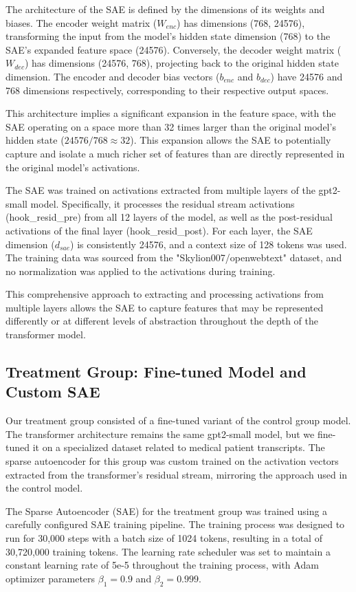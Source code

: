 The architecture of the SAE is defined by the dimensions of its weights and biases. The encoder weight matrix ($W_{enc}$) has dimensions (768, 24576), transforming the input from the model's hidden state dimension (768) to the SAE's expanded feature space (24576). Conversely, the decoder weight matrix ($W_{dec}$) has dimensions (24576, 768), projecting back to the original hidden state dimension. The encoder and decoder bias vectors ($b_{enc}$ and $b_{dec}$) have 24576 and 768 dimensions respectively, corresponding to their respective output spaces.

This architecture implies a significant expansion in the feature space, with the SAE operating on a space more than 32 times larger than the original model's hidden state ($24576 / 768 \approx 32$). This expansion allows the SAE to potentially capture and isolate a much richer set of features than are directly represented in the original model's activations.

The SAE was trained on activations extracted from multiple layers of the gpt2-small model. Specifically, it processes the residual stream activations (hook\_resid\_pre) from all 12 layers of the model, as well as the post-residual activations of the final layer (hook\_resid\_post). For each layer, the SAE dimension ($d_{sae}$) is consistently 24576, and a context size of 128 tokens was used. The training data was sourced from the "Skylion007/openwebtext" dataset, and no normalization was applied to the activations during training.

This comprehensive approach to extracting and processing activations from multiple layers allows the SAE to capture features that may be represented differently or at different levels of abstraction throughout the depth of the transformer model.

\subsection{Treatment Group: Fine-tuned Model and Custom SAE}

Our treatment group consisted of a fine-tuned variant of the control group model. The transformer architecture remains the same gpt2-small model, but we fine-tuned it on a specialized dataset related to medical patient transcripts. The sparse autoencoder for this group was custom trained on the activation vectors extracted from the transformer's residual stream, mirroring the approach used in the control model.

The Sparse Autoencoder (SAE) for the treatment group was trained using a carefully configured SAE training pipeline. The training process was designed to run for 30,000 steps with a batch size of 1024 tokens, resulting in a total of 30,720,000 training tokens. The learning rate scheduler was set to maintain a constant learning rate of 5e-5 throughout the training process, with Adam optimizer parameters $\beta_{1} = 0.9$ and $\beta_{2} = 0.999$.

